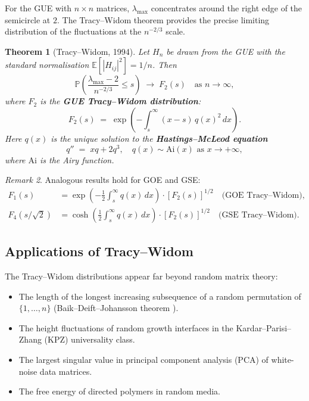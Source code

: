 \documentclass[12pt,a4paper]{amsart}
\newtheorem{theorem}{Theorem}[section]
\theoremstyle{definition}
\theoremstyle{remark}
\newtheorem{remark}[theorem]{Remark}
\begin{document}
For the GUE with $n \times n$ matrices, $\lambda_{\max}$ concentrates around
the right edge of the semicircle at $2$. The Tracy--Widom theorem provides
the precise limiting distribution of the fluctuations at the $n^{-2/3}$ scale.

\begin{theorem}[Tracy--Widom, 1994]
\label{thm:tracywidom}
Let $H_n$ be drawn from the GUE with the standard normalisation
$\mathbb{E}[|H_{ij}|^2] = 1/n$. Then
\[
  \mathbb{P}\!\left(\frac{\lambda_{\max} - 2}{n^{-2/3}} \leq s\right)
  \;\longrightarrow\; F_2(s) \quad \text{as } n \to \infty,
\]
where $F_2$ is the \textbf{GUE Tracy--Widom distribution}:
\[
  F_2(s) \;=\; \exp\!\left(-\int_s^\infty (x-s)\,q(x)^2\,dx\right).
\]
Here $q(x)$ is the unique solution to the \textbf{Hastings--McLeod equation}
\[
  q'' \;=\; xq + 2q^3, \quad q(x) \sim \mathrm{Ai}(x) \text{ as } x \to +\infty,
\]
where $\mathrm{Ai}$ is the Airy function.
\end{theorem}

\begin{remark}
Analogous results hold for GOE and GSE:
\begin{align*}
  F_1(s) &= \exp\!\left(-\frac{1}{2}\int_s^\infty q(x)\,dx\right)\cdot [F_2(s)]^{1/2}
  \quad \text{(GOE Tracy--Widom)},\\
  F_4(s/\sqrt{2}) &= \cosh\!\left(\frac{1}{2}\int_s^\infty q(x)\,dx\right)\cdot [F_2(s)]^{1/2}
  \quad \text{(GSE Tracy--Widom)}.
\end{align*}
\end{remark}

\subsection{Applications of Tracy--Widom}

The Tracy--Widom distributions appear far beyond random matrix theory:
\begin{itemize}
  \item The length of the longest increasing subsequence of a random permutation
    of $\{1,\ldots,n\}$ (Baik--Deift--Johansson theorem \cite{BaikDeiftJohansson1999}).
  \item The height fluctuations of random growth interfaces in the
    Kardar--Parisi--Zhang (KPZ) universality class.
  \item The largest singular value in principal component analysis (PCA)
    of white-noise data matrices.
  \item The free energy of directed polymers in random media.
\end{itemize}
\end{document}
